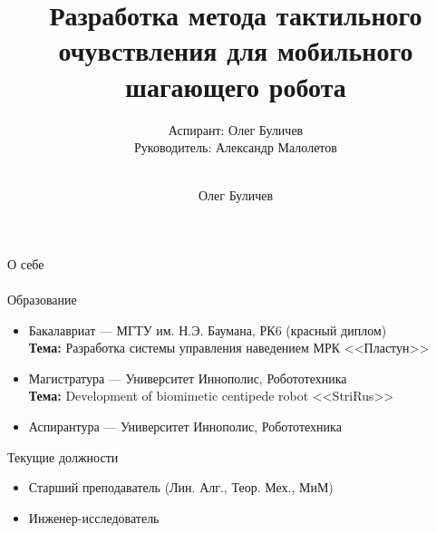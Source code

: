 \documentclass[aspectratio=169,xcolor=table]{beamer}
\title[]{Разработка метода тактильного очувствления для мобильного шагающего робота} %
\subtitle{Аспирант: Олег Буличев \\ Руководитель: Александр Малолетов \\ \ } %
\author{Олег Буличев}
\newcommand{\fbckg}[1]{\usebackgroundtemplate{\texttt{[image: \#1]}}}%
\begin{document}
\setlength{\abovedisplayskip}{0pt}
\setlength{\belowdisplayskip}{0pt}
\setlength{\abovedisplayshortskip}{0pt}
\setlength{\belowdisplayshortskip}{0pt}

\fbckg{fibeamer/figs/title_page.png}

\fbckg{fibeamer/figs/common.png}

\begin{frame}[t]{О себе}
\framesubtitle{}
    \begin{exampleblock}{Образование}
        \begin{itemize}
            \item Бакалавриат --- МГТУ им. Н.Э. Баумана, РК6 (красный диплом) \\ \textbf{Тема:} Разработка системы управления наведением МРК <<Пластун>>
            \item Магистратура --- Университет Иннополис, Робототехника \\ \textbf{Тема:} Development of biomimetic centipede robot <<StriRus>>
            \item Аспирантура --- Университет Иннополис, Робототехника
        \end{itemize}
    \end{exampleblock}
    \begin{alertblock}{Текущие должности}
        \begin{itemize}
        \item Старший преподаватель (Лин. Алг., Теор. Мех., МиМ)
        \item Инженер-исследователь
    \end{itemize}
    \end{alertblock}
\end{frame}
\end{document}
